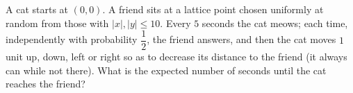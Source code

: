A cat starts at $(0,0)$. A friend sits at a lattice point chosen uniformly at random from those with $|x|,|y|\le10$. Every $5$ seconds the cat meows; each time, independently with probability $\dfrac12$, the friend answers, and then the cat moves $1$ unit up, down, left or right so as to decrease its distance to the friend (it always can while not there). What is the expected number of seconds until the cat reaches the friend?
